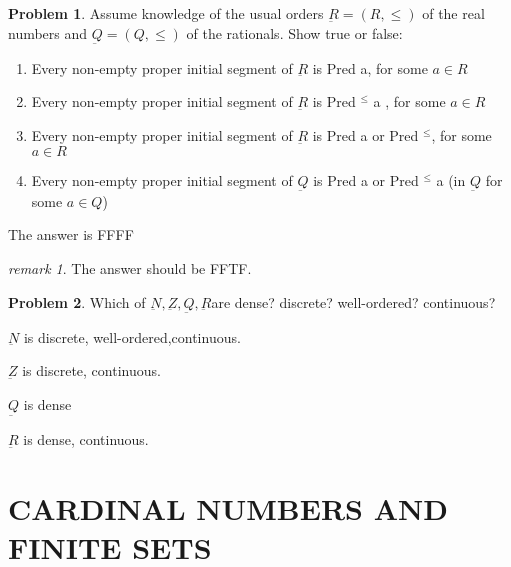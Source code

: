 \documentclass[a4paper,11pt]{article}%
\theoremstyle{remark}
\newtheorem*{remark}{remark}
\theoremstyle{definition}
\newtheorem{problem}{Problem}[subsection]
\begin{document}
\begin{problem}
    Assume knowledge of the usual orders $\underbar{R}=(R,\leq)$ of the real
    numbers and $\underbar{Q}=(Q,\leq)$ of the rationals.
    Show true or false:
    \begin{enumerate}
        \item Every non-empty proper initial segment of $\underbar{R}$ is Pred a, for some $a\in R$
        \item Every non-empty proper initial segment of $\underbar{R}$ is Pred $^{\leq}$ a , for some $a\in R$
        \item Every non-empty proper initial segment of $\underbar{R}$ is Pred  a or Pred $^{\leq}$, for some $a\in R$
        \item Every non-empty proper initial segment of $\underbar{Q}$ is Pred a or Pred $^{\leq}$ a (in $\underbar{Q}$ for some $a\in Q$)
    \end{enumerate}
    The answer is FFFF
    \begin{remark}
        The answer should be FFTF.
    \end{remark}
\end{problem}
\begin{problem}
    Which of $\underbar{N},\underbar{Z},\underbar{Q},\underbar{R}$are dense? discrete? well-ordered? continuous?

    $\underbar{N}$ is discrete, well-ordered,continuous.

    $\underbar{Z}$ is discrete, continuous.

    $\underbar{Q}$ is dense

    $\underbar{R}$ is dense, continuous.
\end{problem}
\section{CARDINAL NUMBERS AND FINITE SETS}
\end{document}
